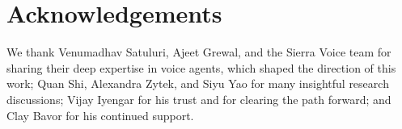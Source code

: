 \section*{Acknowledgements}

We thank Venumadhav Satuluri, Ajeet Grewal, and the Sierra Voice team for sharing their deep expertise in voice agents, which shaped the direction of this work; Quan Shi, Alexandra Zytek, and Siyu Yao for many insightful research discussions; Vijay Iyengar for his trust and for clearing the path forward; and Clay Bavor for his continued support.

